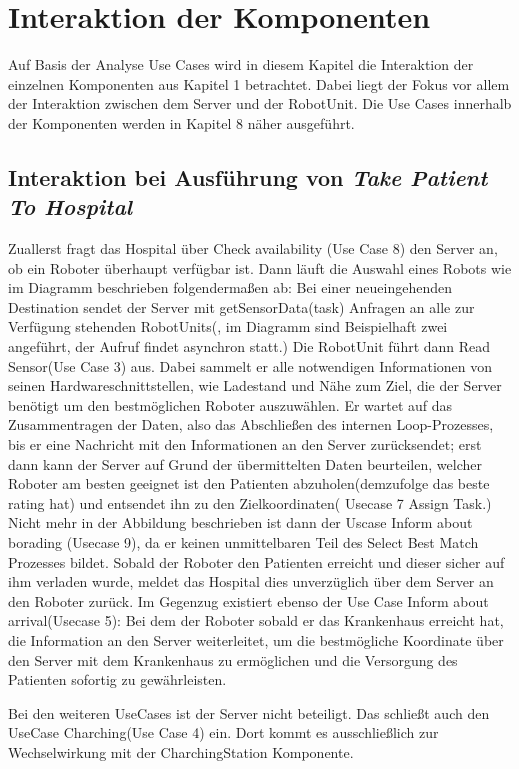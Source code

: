 \section{Interaktion der Komponenten}
Auf Basis der Analyse Use Cases wird in diesem Kapitel die Interaktion der einzelnen Komponenten aus Kapitel 1 betrachtet. Dabei liegt der Fokus vor allem der Interaktion zwischen dem Server und der RobotUnit. Die Use Cases innerhalb der Komponenten werden in Kapitel 8 näher ausgeführt. \\


\subsection*{Interaktion bei Ausführung von \emph{Take Patient To Hospital}}

Zuallerst fragt das Hospital über Check availability (Use Case 8) den Server an, ob ein Roboter überhaupt verfügbar ist. Dann läuft die Auswahl eines Robots wie im Diagramm beschrieben folgendermaßen ab: Bei einer neueingehenden Destination sendet der Server mit getSensorData(task) Anfragen an alle zur Verfügung stehenden RobotUnits(, im Diagramm sind Beispielhaft zwei angeführt, der Aufruf findet asynchron statt.) Die RobotUnit führt dann Read Sensor(Use Case 3) aus. Dabei sammelt er alle notwendigen Informationen von seinen Hardwareschnittstellen, wie Ladestand und Nähe zum Ziel, die der Server benötigt um den bestmöglichen Roboter auszuwählen. Er wartet auf das Zusammentragen der Daten, also das Abschließen des internen Loop-Prozesses, bis er eine Nachricht mit den Informationen an den Server zurücksendet; erst dann kann der Server auf Grund der übermittelten Daten beurteilen, welcher Roboter am besten geeignet ist den Patienten abzuholen(demzufolge das beste rating hat) und entsendet ihn zu den Zielkoordinaten( Usecase 7 Assign Task.) Nicht mehr in der Abbildung beschrieben ist dann der Uscase Inform about borading (Usecase 9), da er keinen unmittelbaren Teil des Select Best Match Prozesses bildet. Sobald der Roboter den Patienten erreicht und dieser sicher auf ihm verladen wurde, meldet das Hospital dies unverzüglich über dem Server an den Roboter zurück. Im Gegenzug existiert ebenso der Use Case Inform about arrival(Usecase 5): Bei dem der Roboter sobald er das Krankenhaus erreicht hat, die Information an den Server weiterleitet, um die bestmögliche Koordinate über den Server mit dem Krankenhaus zu ermöglichen und die Versorgung des Patienten sofortig zu gewährleisten.

Bei den weiteren UseCases ist der Server nicht beteiligt. Das schließt auch den UseCase Charching(Use Case 4) ein. Dort kommt es ausschließlich zur Wechselwirkung mit der CharchingStation Komponente.


